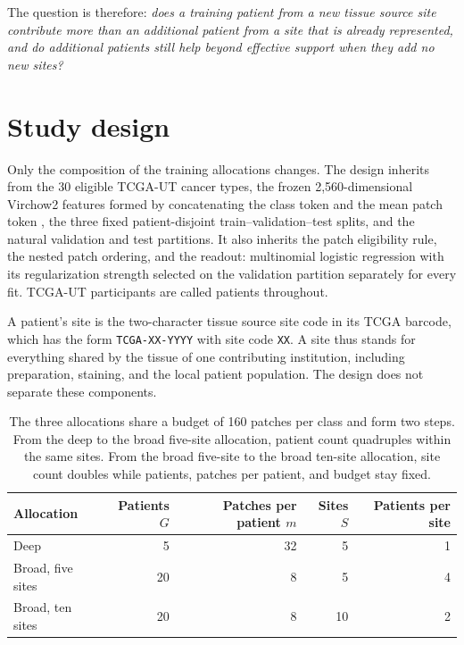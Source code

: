 \documentclass[11pt]{article}
\begin{document}
The question is therefore: \emph{does a training patient from a new tissue source site contribute more than an additional patient from a site that is already represented, and do additional patients still help beyond effective support when they add no new sites?}

\section{Study design}
\label{sec:design}
Only the composition of the training allocations changes. The design inherits from \citet{queisler2026effectiveSupport} the 30 eligible TCGA-UT cancer types, the frozen 2,560-dimensional Virchow2 features formed by concatenating the class token and the mean patch token \citep{zimmermann2024virchow2}, the three fixed patient-disjoint train--validation--test splits, and the natural validation and test partitions. It also inherits the patch eligibility rule, the nested patch ordering, and the readout: multinomial logistic regression with its regularization strength selected on the validation partition separately for every fit. TCGA-UT participants are called patients throughout.

A patient's site is the two-character tissue source site code in its TCGA barcode, which has the form \texttt{TCGA-XX-YYYY} with site code \texttt{XX}. A site thus stands for everything shared by the tissue of one contributing institution, including preparation, staining, and the local patient population. The design does not separate these components.

\begin{table}[htbp]
\centering
\renewcommand{\arraystretch}{1.15}
\begin{tabular}{@{}lrrrr@{}}
\toprule
Allocation & Patients $G$ & Patches per patient $m$ & Sites $S$ & Patients per site \\
\midrule
Deep & 5 & 32 & 5 & 1 \\
Broad, five sites & 20 & 8 & 5 & 4 \\
Broad, ten sites & 20 & 8 & 10 & 2 \\
\bottomrule
\end{tabular}
\caption{The three allocations share a budget of 160 patches per class and form two steps. From the deep to the broad five-site allocation, patient count quadruples within the same sites. From the broad five-site to the broad ten-site allocation, site count doubles while patients, patches per patient, and budget stay fixed.}
\label{tab:allocations}
\end{table}
\end{document}
